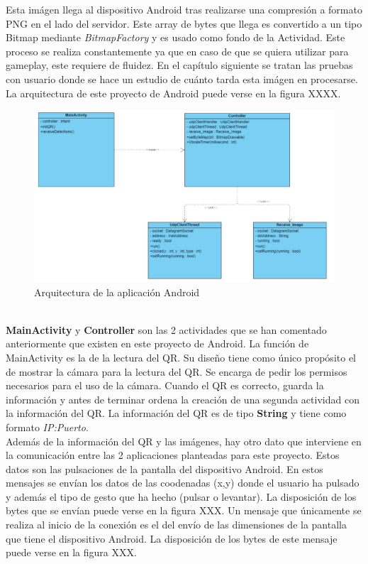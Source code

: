 Esta im\'agen llega al dispositivo Android tras realizarse una compresi\'on a formato PNG en el lado del servidor. Este array de bytes que llega es convertido a un tipo Bitmap mediante \textit{BitmapFactory} y es usado como fondo de la Actividad. Este proceso se realiza constantemente ya que en caso de que se quiera utilizar para gameplay, este requiere de fluidez. En el cap\'itulo siguiente se tratan las pruebas con usuario donde se hace un estudio de cu\'anto tarda esta im\'agen en procesarse. 
\\
La arquitectura de este proyecto de Android puede verse en la figura XXXX. 
\\
\begin{figure}[h]
\centering
\includegraphics[width=1.0\textwidth]{Imagenes/Bitmap/Arquitectura_Android.png}
\caption{Arquitectura de la aplicaci\'on Android}
 \label{Arquitectura_Android}
\end{figure}
\\

\textbf{MainActivity} y \textbf{Controller} son las 2 actividades que se han comentado anteriormente que existen en este proyecto de Android. La funci\'on de MainActivity es la de la lectura del QR. Su dise\~no tiene como \'unico prop\'osito el de mostrar la c\'amara para la lectura del QR. Se encarga de pedir los permisos necesarios para el uso de la c\'amara. Cuando el QR es correcto, guarda la informaci\'on y antes de terminar ordena la creaci\'on de una segunda actividad con la informaci\'on del QR. La informaci\'on del QR es de tipo \textbf{String} y tiene como formato \textit{IP:Puerto}. 
\\
Adem\'as de la informaci\'on del QR y las im\'agenes, hay otro dato que interviene en la comunicaci\'on entre las 2 aplicaciones planteadas para este proyecto. Estos datos son las pulsaciones de la pantalla del dispositivo Android. En estos mensajes se env\'ian los datos de las coodenadas (x,y) donde el usuario ha pulsado y adem\'as el tipo de gesto que ha hecho (pulsar o levantar). La disposici\'on de los bytes que se env\'ian puede verse en la figura XXX. Un mensaje que \'unicamente se realiza al inicio de la conexi\'on es el del env\'io de las dimensiones de la pantalla que tiene el dispositivo Android. La disposici\'on de los bytes de este mensaje puede verse en la figura XXX.


